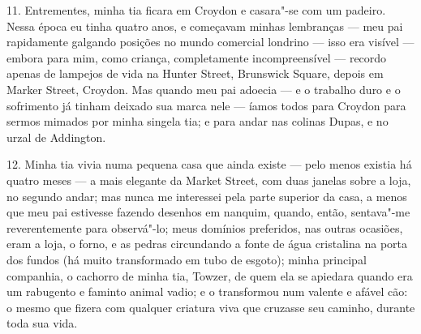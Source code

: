 11. Entrementes, minha tia ficara em Croydon e casara"-se com um padeiro.
Nessa época eu tinha quatro anos, e começavam minhas lembranças --- meu
pai rapidamente galgando posições no mundo comercial londrino --- isso
era visível --- embora para mim, como criança, completamente
incompreensível --- recordo apenas de lampejos de vida na Hunter Street,
Brunswick Square, depois em Marker Street, Croydon. Mas quando meu pai
adoecia --- e o trabalho duro e o sofrimento já tinham deixado sua marca
nele --- íamos todos para Croydon para sermos mimados por minha singela
tia; e para andar nas colinas Dupas, e no urzal de Addington.

12. Minha tia vivia numa pequena casa que ainda existe --- pelo menos
existia há quatro meses --- a mais elegante da Market Street, com duas
janelas sobre a loja, no segundo andar; mas nunca me interessei pela
parte superior da casa, a menos que meu pai estivesse fazendo desenhos
em nanquim, quando, então, sentava"-me reverentemente para observá"-lo;
meus domínios preferidos, nas outras ocasiões, eram a loja, o forno, e
as pedras circundando a fonte de água cristalina na porta dos fundos (há
muito transformado em tubo de esgoto); minha principal companhia, o
cachorro de minha tia, Towzer, de quem ela se apiedara quando era um
rabugento e faminto animal vadio; e o transformou num valente e afável
cão: o mesmo que fizera com qualquer criatura viva que cruzasse seu
caminho, durante toda sua vida.


